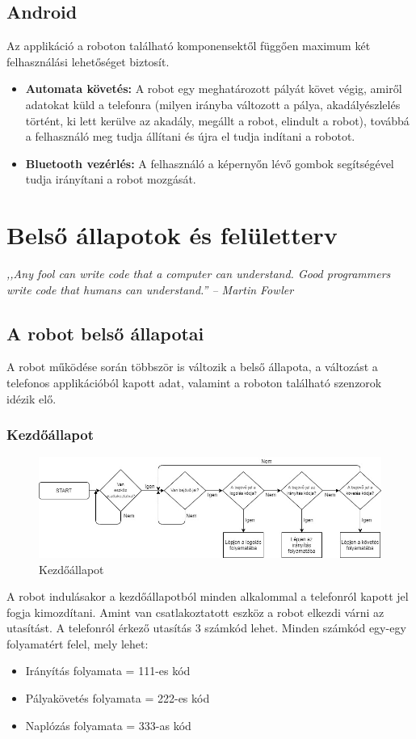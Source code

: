 \documentclass[]{thesis-ekf}
\theoremstyle{definition}
\begin{document}
\section{Android}
Az applikáció a roboton található komponensektől függően maximum két felhasználási lehetőséget biztosít.
\begin{itemize}
	\item \textbf{Automata követés:} A robot egy meghatározott pályát követ végig, amiről adatokat küld a telefonra (milyen irányba változott a pálya, akadályészlelés történt, ki lett kerülve az akadály, megállt a robot, elindult a robot), továbbá a felhasználó meg tudja állítani és újra el tudja indítani a robotot.
	\item \textbf{Bluetooth vezérlés:} A felhasználó a képernyőn lévő gombok segítségével tudja irányítani a robot mozgását.
\end{itemize}
\chapter{Belső állapotok és felületterv}
\emph{,,Any fool can write code that a computer can understand. Good programmers write code that humans can understand.'' -- Martin Fowler}
\section{A robot belső állapotai}
A robot működése során többször is változik a belső állapota, a változást a telefonos applikációból kapott adat, valamint a roboton található szenzorok idézik elő.
\subsection{Kezdőállapot}\label{kezdokepernyo_allapot}
\begin{figure}[h]
	\centering
	\includegraphics[width=\columnwidth]{images/grafok/fomenu_graf}
	\caption{Kezdőállapot}
	\label{start_allapot}
\end{figure}
A robot indulásakor a kezdőállapotból minden alkalommal a telefonról kapott jel fogja kimozdítani. Amint van csatlakoztatott eszköz a robot elkezdi várni az utasítást. A telefonról érkező utasítás 3 számkód lehet. Minden számkód egy-egy folyamatért felel, mely lehet:
\begin{itemize}
	\item Irányítás folyamata = 111-es kód
	\item Pályakövetés folyamata = 222-es kód
	\item Naplózás folyamata = 333-as kód
\end{itemize}
\end{document}

